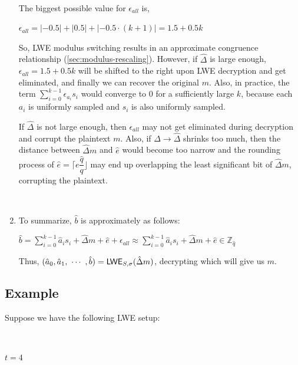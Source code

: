 \begin{myproof}
\begin{enumerate}
$ $

The biggest possible value for $\epsilon_{\textit{all}}$ is, 

$\epsilon_{\textit{all}} = |-0.5| + |0.5| + |-0.5 \cdot (k+1)| = 1.5 + 0.5k$ 

So, LWE modulus switching results in an approximate congruence relationship (\autoref{sec:modulus-rescaling}). However, if $\hat \Delta$ is large enough, $\epsilon_{\textit{all}} = 1.5 + 0.5k$ will be shifted to the right upon LWE decryption and get eliminated, and finally we can recover the original $m$. Also, in practice, the term $\sum\limits_{i=0}^{k-1}\epsilon_{a_i}s_i$ would converge to 0 for a sufficiently large $k$, because each $a_i$ is uniformly sampled and $s_i$ is also uniformly sampled. 

 If $\hat \Delta$ is not large enough, then $\epsilon_{all}$ may not get eliminated during decryption and corrupt the plaintext $m$. Also, if $\Delta \rightarrow \hat\Delta$ shrinks too much, then the distance between $\hat\Delta m$ and $\hat e$ would become too narrow and the rounding process of $\hat e = \Big\lceil e \dfrac{\hat{q}}{q} \Big\rfloor$ may end up overlapping the least significant bit of $\hat \Delta m$, corrupting the plaintext. 

$ $

\item To summarize, $\hat{b}$ is approximately as follows:

$\hat{b} = \sum\limits_{i=0}^{k-1}\hat{a}_is_i + \hat{\Delta} m + \hat{e} + \epsilon_{\textit{all}}  \approx \sum\limits_{i=0}^{k-1}\hat{a}_i  s_i + \hat{\Delta} m + \hat{e} \in \mathbb{Z}_{\hat{q}}$

Thus, $(\hat{a}_0, \hat{a}_1, \text{ } \text{$\cdots$} \text{ }, \hat{b}) = \textsf{LWE}_{{S},\sigma}(\hat{\Delta}  m)$, decrypting which will give us $m$.


\end{enumerate}
\end{myproof}

\subsection{Example}

Suppose we have the following LWE setup:

$ $

$t = 4$

